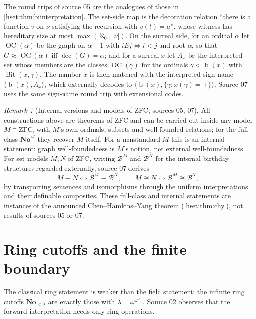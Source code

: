 \documentclass[11pt,letterpaper]{article}
\theoremstyle{definition}
\theoremstyle{remark}
\newtheorem{remark}[remark]{Remark}\aliascntresetthe{remark}
\newcommand{\No}{\mathbf{No}}
\newcommand{\bd}{\operatorname{b}}
\newcommand{\B}{\mathcal B}
\newcommand{\Bit}{\operatorname{Bit}}
\newcommand{\OC}{\operatorname{OC}}
\newcommand{\card}[1]{\lvert#1\rvert}
\newcommand{\ZFC}{\mathrm{ZFC}}
\begin{document}
The round trips of source 05 are the analogues of those in
\cref{hset:thm:biinterpretation}. The set-side map is the decoration relation
``there is a function $v$ on $\nu$ satisfying the recursion with $v(t)=a$'',
whose witness has hereditary size at most $\max(\aleph_0,\card\nu)$. On the
surreal side, for an ordinal $\alpha$ let $\OC(\alpha)$ be the graph on
$\alpha+1$ with $iEj\iff i<j$ and root $\alpha$, so that
$G\approx\OC(\alpha)$ iff $\operatorname{dec}(G)=\alpha$; and for a surreal
$x$ let $A_x$ be the interpreted set whose members are the classes
$\OC(\gamma)$ for the ordinals $\gamma<\bd(x)$ with $\Bit(x,\gamma)$. The
number $x$ is then matched with the interpreted sign name
$\langle\bd(x),A_x\rangle$, which externally decodes to
$\langle\bd(x),\{\gamma:x(\gamma)=+\}\rangle$. Source 07 uses the same
sign-name round trip with extensional codes.

\begin{remark}[Internal versions and models of ZFC; sources 05, 07]
\label{hset:rem:internal}
All constructions above are theorems of ZFC and can be carried out inside any
model $M\models\ZFC$, with $M$'s own ordinals, subsets and well-founded
relations; for the full class $\No^M$ they recover $M$ itself. For a
nonstandard $M$ this is an internal statement: graph well-foundedness is $M$'s
notion, not external well-foundedness. For set models $M,N$ of ZFC, writing
$\B^M$ and $\B^N$ for the internal birthday structures regarded externally,
source 07 derives
\[
 M\equiv N\iff\B^M\equiv\B^N,\qquad M\cong N\iff\B^M\cong\B^N,
\]
by transporting sentences and isomorphisms through the uniform
interpretations and their definable composites. These full-class and internal
statements are instances of the announced Chen--Hamkins--Yang theorem
(\cref{hset:thm:chy}), not results of sources 05 or 07.
\end{remark}

\section{Ring cutoffs and the finite boundary}
\label{hset:sec:rings}

The classical ring statement is weaker than the field statement: the infinite
ring cutoffs $\No_{<\lambda}$ are exactly those with $\lambda=\omega^{\omega^\alpha}$
\cite[Theorems 1.1--1.2]{BG}. Source 02 observes that the forward
interpretation needs only ring operations.
\end{document}
